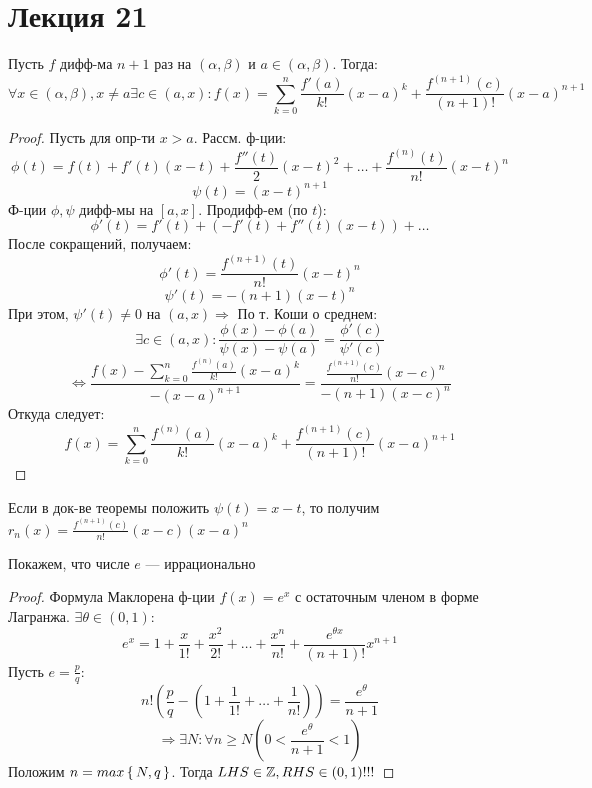 \section{Лекция 21}
\begin{theorem}
  Пусть $f$ дифф-ма $n + 1$ раз на $(\alpha, \beta)$ и $a \in (\alpha, \beta)$. Тогда:
  \[
  \forall x \in (\alpha, \beta), x \neq a \exists c \in (a, x) \colon f(x) = \sum_{k = 0}^{n} \frac{f'(a)}{k!}(x - a)^{k} + \frac{f^{(n + 1)}(c)}{(n + 1)!}(x - a)^{n + 1}
  \]
\end{theorem}
\begin{proof}
  Пусть для опр-ти $x > a$. Рассм. ф-ции:
  \[
  \phi(t) = f(t) + f'(t)(x - t) + \frac{f''(t)}{2}(x - t)^{2} + \ldots + \frac{f^{(n)}(t)}{n!}(x - t)^{n}
  \]
  \[
  \psi(t) = (x - t)^{n + 1}
  \]
  Ф-ции $\phi, \psi$ дифф-мы на $[a, x]$. Продифф-ем (по $t$):
  \[
  \phi'(t) = f'(t) + (-f'(t) + f''(t)(x - t)) + \ldots
  \]
  После сокращений, получаем:
  \[
  \phi'(t) = \frac{f^{(n + 1)}(t)}{n!}(x - t)^{n}
  \]
  \[
  \psi'(t) = -(n + 1)(x - t)^{n}
  \]
  При этом, $\psi'(t) \neq 0$ на $(a, x) \Rightarrow$ По т. Коши о среднем:
  \[
  \exists c \in (a, x) \colon \frac{\phi(x) - \phi(a)}{\psi(x) - \psi(a)} = \frac{\phi'(c)}{\psi'(c)}
  \]
  \[
  \iff \frac{f(x) - \sum_{k = 0}^{n} \frac{f^{(n)}(a)}{k!}(x - a)^{k}}{-(x - a)^{n + 1}} = \frac{\frac{f^{(n + 1)}(c)}{n!}(x - c)^{n}}{-(n + 1)(x - c)^{n}}
  \]
  Откуда следует:
  \[
  f(x) = \sum_{k = 0}^{n} \frac{f^{(n)}(a)}{k!}(x - a)^{k} + \frac{f^{(n + 1)}(c)}{(n + 1)!}(x - a)^{n + 1}
  \]
\end{proof}
\begin{note}
 Если в док-ве теоремы положить $\psi(t) = x - t$, то получим $r_n(x) = \frac{f^{(n + 1)}(c)}{n!}(x - c)(x - a)^{n}$
\end{note}
\begin{example}
Покажем, что числе $e$ --- иррационально
\end{example}
\begin{proof}
Формула Маклорена ф-ции $f(x) = e^{x}$ с остаточным членом в форме Лагранжа. $\exists \theta \in (0, 1)$:
\[
e^{x} = 1 + \frac{x}{1!} + \frac{x^{2}}{2!} + \ldots + \frac{x^{n}}{n!} + \frac{e^{\theta x}}{(n + 1)!} x^{n + 1}
\]
Пусть $e = \frac{p}{q}$:
\[
n!(\frac{p}{q} - (1 + \frac{1}{1!} + \ldots + \frac{1}{n!})) = \frac{e^{\theta}}{n + 1}
\]
\[
\Rightarrow \exists N \colon \forall n \geq N (0 < \frac{e^{\theta}}{n + 1} < 1)
\]
Положим $n = max\set{N, q}$. Тогда $LHS \in \mathbb{Z}, RHS \in (0, 1)!!!$
\end{proof}
